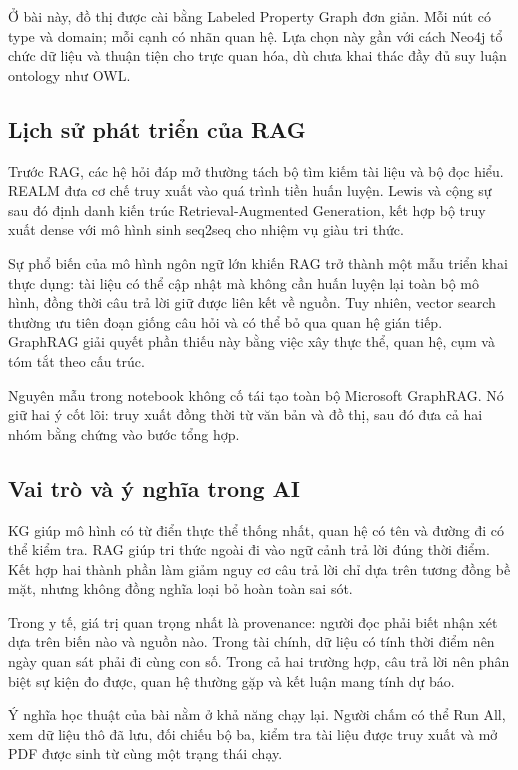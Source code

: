 Ở bài này, đồ thị được cài bằng Labeled Property Graph đơn giản. Mỗi nút
có type và domain; mỗi cạnh có nhãn quan hệ. Lựa chọn này gần với cách
Neo4j tổ chức dữ liệu và thuận tiện cho trực quan hóa, dù chưa khai thác
đầy đủ suy luận ontology như OWL.

\subsection{Lịch sử phát triển của RAG}\label{lux1ecbch-sux1eed-phuxe1t-triux1ec3n-cux1ee7a-RAG}

Trước RAG, các hệ hỏi đáp mở thường tách bộ tìm kiếm tài liệu và bộ đọc
hiểu. REALM đưa cơ chế truy xuất vào quá trình tiền huấn luyện. Lewis và
cộng sự sau đó định danh kiến trúc Retrieval-Augmented Generation, kết
hợp bộ truy xuất dense với mô hình sinh seq2seq cho nhiệm vụ giàu tri
thức.

Sự phổ biến của mô hình ngôn ngữ lớn khiến RAG trở thành một mẫu triển
khai thực dụng: tài liệu có thể cập nhật mà không cần huấn luyện lại
toàn bộ mô hình, đồng thời câu trả lời giữ được liên kết về nguồn. Tuy
nhiên, vector search thường ưu tiên đoạn giống câu hỏi và có thể bỏ qua
quan hệ gián tiếp. GraphRAG giải quyết phần thiếu này bằng việc xây thực
thể, quan hệ, cụm và tóm tắt theo cấu trúc.

Nguyên mẫu trong notebook không cố tái tạo toàn bộ Microsoft GraphRAG.
Nó giữ hai ý cốt lõi: truy xuất đồng thời từ văn bản và đồ thị, sau đó
đưa cả hai nhóm bằng chứng vào bước tổng hợp.

\subsection{Vai trò và ý nghĩa trong AI}\label{vai-truxf2-vuxe0-uxfd-nghux129a-trong-ai}

KG giúp mô hình có từ điển thực thể thống nhất, quan hệ có tên và đường
đi có thể kiểm tra. RAG giúp tri thức ngoài đi vào ngữ cảnh trả lời đúng
thời điểm. Kết hợp hai thành phần làm giảm nguy cơ câu trả lời chỉ dựa
trên tương đồng bề mặt, nhưng không đồng nghĩa loại bỏ hoàn toàn sai
sót.

Trong y tế, giá trị quan trọng nhất là provenance: người đọc phải biết
nhận xét dựa trên biến nào và nguồn nào. Trong tài chính, dữ liệu có
tính thời điểm nên ngày quan sát phải đi cùng con số. Trong cả hai
trường hợp, câu trả lời nên phân biệt sự kiện đo được, quan hệ thường
gặp và kết luận mang tính dự báo.

Ý nghĩa học thuật của bài nằm ở khả năng chạy lại. Người chấm có thể Run
All, xem dữ liệu thô đã lưu, đối chiếu bộ ba, kiểm tra tài liệu được
truy xuất và mở PDF được sinh từ cùng một trạng thái chạy.

